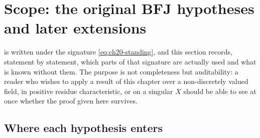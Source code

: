\section{Scope: the original BFJ hypotheses and later extensions}
\label{sec:ch20-scope}

 is written under the signature
\eqref{eq:ch20-standing}, and this section records, statement by statement,
which parts of that signature are actually used and what is known without
them.  The purpose is not completeness but auditability: a reader who
wishes to apply a result of this chapter over a non-discretely valued field,
in positive residue characteristic, or on a singular $X$ should be able to
see at once whether the proof given here survives.

\subsection{Where each hypothesis enters}
\label{sec:ch20-hypothesis-use}

